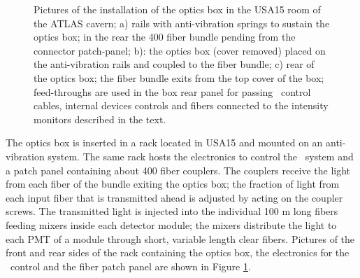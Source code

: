 \begin{figure}[htbp]
\begin{center}
\caption{Pictures of the installation of the optics box in the USA15 room of the
ATLAS cavern; a) rails with anti-vibration springs to sustain the optics box; in the
rear the 400 fiber bundle pending from the connector patch-panel; b): the optics box
(cover removed) placed on the anti-vibration rails and coupled to the fiber bundle;
c) rear of the optics box; the fiber bundle exits from the top cover of the box;
feed-throughs are used in the box rear panel for passing \laser~control cables,
internal devices controls and fibers connected to the intensity monitors described
in the text.  
}\label{fig:x.1}
\end{center}
\end{figure}

The optics box is inserted in a rack located in USA15 and mounted on an anti-vibration system. 
The same rack hosts the electronics 
to control the \lasii~system and a patch panel containing about 400 fiber
couplers. The couplers receive the light from each fiber of the bundle
exiting the optics box; the fraction of light from each input fiber that is transmitted
ahead is adjusted by acting on the coupler screws. The transmitted light is injected
into the individual 100 m long fibers feeding mixers inside each detector module;
the mixers distribute the light to each PMT of a module through short, variable length
clear fibers. Pictures of the front and rear sides of the rack containing the
optics box, the electronics for the \lasii~control and the fiber patch panel are shown in Figure \ref{fig:x.1}.

